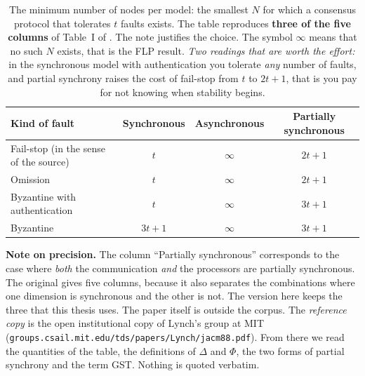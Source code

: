 \begin{table}[t]
\centering
\caption[The minimum number of nodes per model: the smallest $N$ for
which a consensus protocol that tolerates $t$ faults exists.]%
{The minimum number of nodes per model: the smallest $N$ for which a
consensus protocol that tolerates $t$ faults exists. The table
reproduces \textbf{three of the five columns} of Table~I of
\cite{dwork1988consensus}. The note justifies the choice. The symbol
$\infty$ means that no such $N$ exists, that is the FLP result.
\emph{Two readings that are worth the effort:} in the synchronous model
with authentication you tolerate \emph{any} number of faults, and
partial synchrony raises the cost of fail-stop from $t$ to $2t{+}1$,
that is you pay for not knowing when stability begins.}
\label{tab:dls}
\small
\begin{tabular}{@{}l c c c@{}}
\toprule
\textbf{Kind of fault} & \textbf{Synchronous} & \textbf{Asynchronous} &
\textbf{Partially synchronous} \\
\midrule
Fail-stop (in the sense of the source) & $t$ & $\infty$ & $2t+1$ \\
Omission                  & $t$      & $\infty$ & $2t+1$ \\
Byzantine with authentication & $t$  & $\infty$ & $3t+1$ \\
Byzantine                 & $3t+1$   & $\infty$ & $3t+1$ \\
\bottomrule
\end{tabular}

\vspace{4pt}
\begin{minipage}{0.94\linewidth}\footnotesize
\textbf{Note on precision.} The column \enquote{Partially synchronous}
corresponds to the case where \emph{both} the communication \emph{and}
the processors are partially synchronous. The original gives five
columns, because it also separates the combinations where one dimension
is synchronous and the other is not. The version here keeps the three
that this thesis uses. The paper itself is outside the corpus. The
\emph{reference copy} is the open institutional copy of Lynch's group at
MIT (\texttt{groups.csail.mit.edu/tds/papers/Lynch/jacm88.pdf}). From
there we read the quantities of the table, the definitions of $\Delta$
and $\Phi$, the two forms of partial synchrony and the term GST. Nothing
is quoted verbatim.


\end{minipage}
\end{table}
